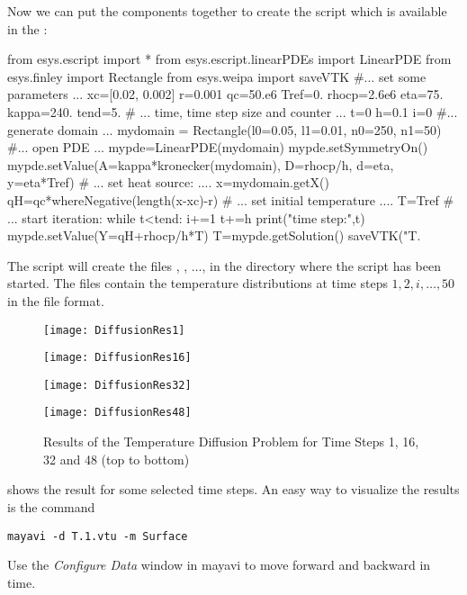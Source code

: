 Now we can put the components together to create the script 
which is available in the \ExampleDirectory{}:
\begin{python}
  from esys.escript import *
  from esys.escript.linearPDEs import LinearPDE
  from esys.finley import Rectangle
  from esys.weipa import saveVTK
  #... set some parameters ...
  xc=[0.02, 0.002]
  r=0.001
  qc=50.e6
  Tref=0.
  rhocp=2.6e6
  eta=75.
  kappa=240.
  tend=5.
  # ... time, time step size and counter ...
  t=0
  h=0.1
  i=0
  #... generate domain ...
  mydomain = Rectangle(l0=0.05, l1=0.01, n0=250, n1=50)
  #... open PDE ...
  mypde=LinearPDE(mydomain)
  mypde.setSymmetryOn()
  mypde.setValue(A=kappa*kronecker(mydomain), D=rhocp/h, d=eta, y=eta*Tref)
  # ... set heat source: ....
  x=mydomain.getX()
  qH=qc*whereNegative(length(x-xc)-r)
  # ... set initial temperature ....
  T=Tref
  # ... start iteration:
  while t<tend:
        i+=1
        t+=h
        print("time step:",t)
        mypde.setValue(Y=qH+rhocp/h*T)
        T=mypde.getSolution()
        saveVTK("T.%
\end{python}
The script will create the files , , $\ldots$,
 in the directory where the script has been started.
The files contain the temperature distributions at time steps $1, 2, i,
\ldots, 50$ in the \VTK file format.

\begin{figure}
\centerline{\texttt{[image: DiffusionRes1]}}
\centerline{\texttt{[image: DiffusionRes16]}}
\centerline{\texttt{[image: DiffusionRes32]}}
\centerline{\texttt{[image: DiffusionRes48]}}
\caption{Results of the Temperature Diffusion Problem for Time Steps 1, 16, 32
         and 48 (top to bottom)}
\label{DIFFUSION FIG 2}
\end{figure}
 shows the result for some selected time steps.
An easy way to visualize the results is the command
\begin{verbatim}
mayavi -d T.1.vtu -m Surface
\end{verbatim}
Use the \emph{Configure Data} window in mayavi to move forward and backward in time.

